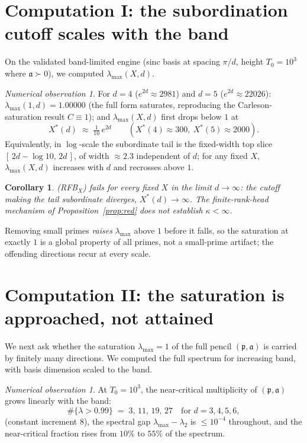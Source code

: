 \documentclass[11pt]{amsart}
\newtheorem{corollary}[theorem]{Corollary}
\theoremstyle{definition}
\theoremstyle{remark}
\newtheorem{observation}[theorem]{Numerical observation}
\newcommand{\fa}{\mathfrak a}
\newcommand{\fp}{\mathfrak p}
\begin{document}
\section{Computation I: the subordination cutoff scales with the
band}\label{sec:c1}
On the validated band-limited engine (sinc basis at spacing $\pi/d$, height
$T_0=10^3$ where $\fa\succ0$), we computed $\lambda_{\max}(X,d)$.

\begin{observation}\label{obs:c1}
For $d=4$ ($e^{2d}\approx2981$) and $d=5$ ($e^{2d}\approx22026$):
$\lambda_{\max}(1,d)=1.00000$ (the full form saturates, reproducing the
Carleson-saturation result $C\equiv1$); and $\lambda_{\max}(X,d)$ first drops
below $1$ at
\[
X^\ast(d)\;\approx\;\tfrac1{10}\,e^{2d}\qquad(X^\ast(4)\approx300,\ X^\ast(5)\approx2000).
\]
Equivalently, in $\log$-scale the subordinate tail is the fixed-width top slice
$[\,2d-\log10,\,2d\,]$, of width $\approx2.3$ independent of $d$; for any fixed
$X$, $\lambda_{\max}(X,d)$ increases with $d$ and recrosses above $1$.
\end{observation}

\begin{corollary}\label{cor:c1}
(RFB$_X$) fails for every fixed $X$ in the limit $d\to\infty$: the cutoff making
the tail subordinate diverges, $X^\ast(d)\to\infty$. The finite-rank-head
mechanism of Proposition~\ref{prop:red} does not establish $\kappa<\infty$.
\end{corollary}

Removing small primes \emph{raises} $\lambda_{\max}$ above $1$ before it falls,
so the saturation at exactly $1$ is a global property of all primes, not a
small-prime artifact; the offending directions recur at every scale.

\section{Computation II: the saturation is approached, not
attained}\label{sec:c2}
We next ask whether the saturation $\lambda_{\max}=1$ of the full pencil
$(\fp,\fa)$ is carried by finitely many directions. We computed the full
spectrum for increasing band, with basis dimension scaled to the band.

\begin{observation}\label{obs:c2}
At $T_0=10^3$, the near-critical multiplicity of $(\fp,\fa)$ grows linearly with
the band:
\[
\#\{\lambda>0.99\}\;=\;3,\,11,\,19,\,27\quad\text{for }d=3,4,5,6,
\]
(constant increment $8$), the spectral gap $\lambda_{\max}-\lambda_2$ is
$\le10^{-4}$ throughout, and the near-critical fraction rises from $10\%$ to
$55\%$ of the spectrum.
\end{observation}
\end{document}
